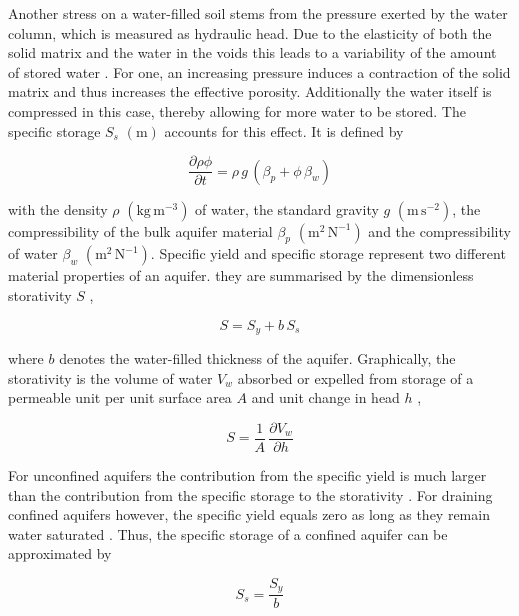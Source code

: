 Another stress on a water-filled soil stems from the pressure exerted by the water column, which is measured as hydraulic head. Due to the elasticity of both the solid matrix and the water in the voids this leads to a variability of the amount of stored water \parencite{Fetter.2001}. For one, an increasing pressure induces a contraction of the solid matrix and thus increases the effective porosity. Additionally the water itself is compressed in this case, thereby allowing for more water to be stored. The specific storage $S_s$ $(\textrm{m})$ accounts for this effect. It is defined by

\begin{equation}
    \frac{\partial \rho \phi}{\partial t} = \rho \, g \, \left( \beta_p + \phi \, \beta_w \right)
\end{equation}

\noindent with the density $\rho$ $(\textrm{kg} \, \textrm{m}^{-3})$ of water, the standard gravity $g$ $(\textrm{m} \, \textrm{s}^{-2})$, the compressibility of the bulk aquifer material $\beta_p$ $(\textrm{m}^{2} \, \textrm{N}^{-1})$ and the compressibility of water $\beta_w$ $(\textrm{m}^{2} \, \textrm{N}^{-1})$. Specific yield and specific storage represent two different material properties of an aquifer. they are summarised by the dimensionless storativity $S$ \parencite{Fetter.2001},

\begin{equation}
    \label{Eq-Storativity}
    S = S_y + b \, S_s
\end{equation}

\noindent where $b$ denotes the water-filled thickness of the aquifer. Graphically, the storativity is the volume of water $V_w$ absorbed or expelled from storage of a permeable unit per unit surface area $A$ and unit change in head $h$ \parencite{Fetter.2001},

\begin{equation}
    S = \frac{1}{A} \, \frac{\partial V_w}{\partial h}
\end{equation}

For unconfined aquifers the contribution from the specific yield is much larger than the contribution from the specific storage to the storativity \parencite{Todd.2005}. For draining confined aquifers however, the specific yield equals zero as long as they remain water saturated \parencite{Fetter.2001}. Thus, the specific storage of a confined aquifer can be approximated by

\begin{equation}
    \label{Eq-SsSy}
    S_s = \frac{S_y}{b}
\end{equation}

